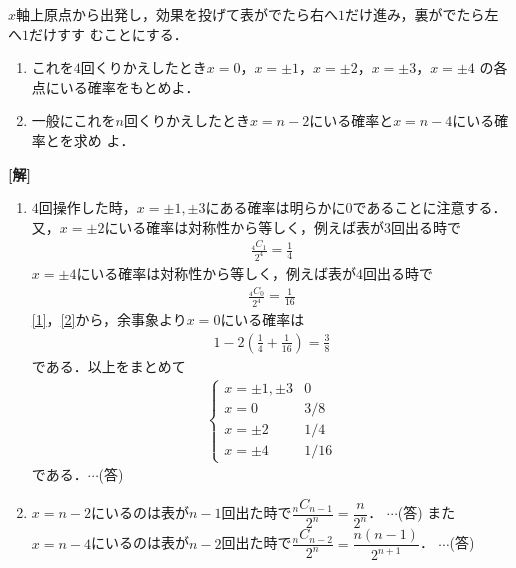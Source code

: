 \documentclass[a4j]{jarticle}
\begin{document}

     \begin{oframed}
     $x$軸上原点から出発し，効果を投げて表がでたら右へ$1$だけ進み，裏がでたら左へ$1$だけすす
     むことにする．
          \begin{enumerate}[(1)]
          \item これを$4$回くりかえしたとき$x=0$，$x=\pm1$，$x=\pm2$，$x=\pm3$，$x=\pm4$
          の各点にいる確率をもとめよ．
          \item 一般にこれを$n$回くりかえしたとき$x=n-2$にいる確率と$x=n-4$にいる確率とを求め
          よ．
          \end{enumerate}
     \end{oframed}

\setlength{\columnseprule}{0.4pt}
\begin{multicols}{2}
{\bf[解]}
     \begin{enumerate}[(1)]
     \item $4$回操作した時，$x=\pm1,\pm3$にある確率は明らかに$0$であることに注意する．
     又，$x=\pm2$にいる確率は対称性から等しく，例えば表が$3$回出る時で
          \begin{align}
          \frac{{}_4C_1}{2^4}=\frac{1}{4}\label{1}
          \end{align}
     $x=\pm4$にいる確率は対称性から等しく，例えば表が$4$回出る時で
          \begin{align}
          \frac{{}_4C_0}{2^4}=\frac{1}{16}\label{2}
          \end{align}
     \eqref{1}，\eqref{2}から，余事象より$x=0$にいる確率は
          \begin{align*}
          1-2\left(\frac{1}{4}+\frac{1}{16}\right)=\frac{3}{8}
          \end{align*}
     である．以上をまとめて
          \begin{align*}
          \left\{
               \begin{array}{ll}
               x=\pm1,\pm3 & 0     \\
               x=0                & 3/8   \\
               x=\pm2          & 1/4   \\
               x=\pm4          & 1/16
               \end{array}
          \right.
          \end{align*}
     である．$\cdots$(答)
     
     \item $x=n-2$にいるのは表が$n-1$回出た時で$\dfrac{{}_nC_{n-1}}{2^n}=\dfrac{n}{2^n}$．
     $\cdots$(答)
     また$x=n-4$にいるのは表が$n-2$回出た時で$\dfrac{{}_nC_{n-2}}{2^n}=\dfrac{n(n-1)}{2^{n+1}}$．
     $\cdots$(答)
     \end{enumerate}
\newpage
\end{multicols}
\end{document}
